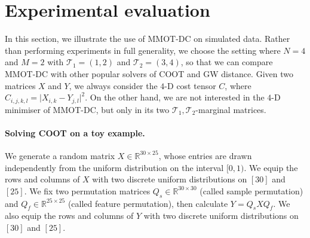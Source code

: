 \documentclass{article}
\begin{document}

\section{Experimental evaluation} \label{sec:exp}
In this section, we illustrate the use of MMOT-DC on simulated data. Rather than performing experiments in full generality, 
we choose the setting where $N = 4$ and $M=2$ with $\mathcal T_1 = (1,2)$ and $\mathcal T_2 = (3,4)$, 
so that we can compare MMOT-DC with other popular solvers of COOT and GW distance. Given two matrices $X$ and $Y$, we always consider the $4$-D cost tensor $C$, 
where $C_{i,j,k,l} = \vert X_{i,k} - Y_{j,l} \vert^2$. On the other hand, we are not interested in the $4$-D minimiser of MMOT-DC, 
but only in its two $\mathcal T_1, \mathcal T_2$-marginal matrices.

\paragraph{Solving COOT on a toy example.} We generate a random matrix $X \in \mathbb R^{30 \times 25}$, whose entries are drawn independently 
from the uniform distribution on the interval $[0,1)$. We equip the rows and columns of $X$ with two discrete uniform distributions 
on $[30]$ and $[25]$. We fix two permutation matrices $Q_s \in \mathbb R^{30 \times 30}$ (called sample permutation) and 
$Q_f \in \mathbb R^{25 \times 25}$ (called feature permutation), then calculate $Y = Q_s X Q_f$. We also equip the rows and columns of $Y$ 
with two discrete uniform distributions on $[30]$ and $[25]$. 
\end{document}

